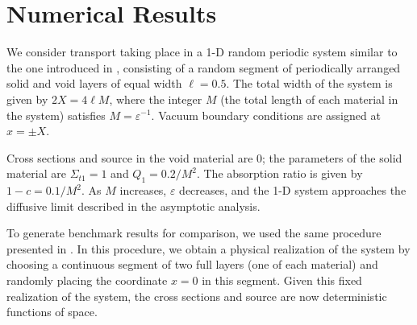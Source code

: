\documentclass{anstrans}
\begin{document}
\section{Numerical Results}
We consider transport taking place in a 1-D random periodic system similar to the one introduced in \cite{zuc94}, consisting of a random segment of periodically arranged solid and void layers of equal width $\ell=0.5$.
The total width of the system is given by $2X = 4\ell M$, where the integer $M$ (the total length of each material in the system) satisfies $M = \varepsilon^{-1}$.
Vacuum boundary conditions are assigned at $x=\pm X$. 

Cross sections and source in the void material are 0; the parameters of the solid material are $\Sigma_{t1} = 1$ and $Q_1 = 0.2/M^2$.
The absorption ratio is given by $1-c = 0.1/M^2$.
As $M$ increases, $\varepsilon$ decreases, and the 1-D system approaches the diffusive limit described in the asymptotic analysis.

To generate benchmark results for comparison, we used the same procedure presented in \cite{vas16}.
In this procedure, we obtain a physical realization of the system by choosing a continuous segment of two full layers (one of each material) and randomly placing the coordinate $x = 0$ in this segment.
Given this fixed realization of the system, the cross sections and source are now deterministic functions of space.
\end{document}
